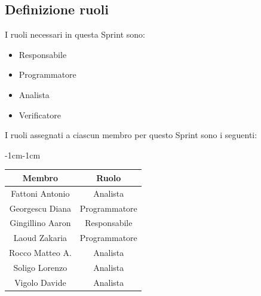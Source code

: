\documentclass[a4paper,12pt]{article}
\begin{document}
\subsection{Definizione ruoli}
I ruoli necessari in questa Sprint sono:
\begin{itemize}[noitemsep]
    \item Responsabile
    \item Programmatore
    \item Analista
    \item Verificatore
\end{itemize}

\noindent I ruoli assegnati a ciascun membro per questo Sprint sono i seguenti:
\begin{table}[H]
    \begin{adjustwidth}{-1cm}{-1cm}
    \centering
\begin{tabular}{|c|c|}
    \hline
    \textbf{Membro} & \textbf{Ruolo} \\
    \hline
    Fattoni Antonio & Analista \\
    \hline
    Georgescu Diana & Programmatore \\
    \hline
    Gingillino Aaron & Responsabile \\
    \hline
    Laoud Zakaria & Programmatore \\
    \hline
    Rocco Matteo A. & Analista \\
    \hline
    Soligo Lorenzo & Analista \\
    \hline
    Vigolo Davide & Analista \\
    \hline
\end{tabular}
    \end{adjustwidth}
\end{table}
\end{document}

